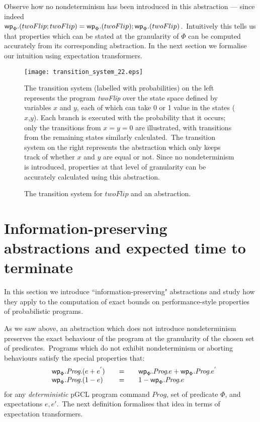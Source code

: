 \documentclass[numbers,copyright,creativecommons]{eptcs}
\newcommand{\Wp}{\mbox{\sf wp}}
\newcommand{\Prog}{\textit{Prog}}
\newcommand{\Wide}[1]{~~~#1~~~}
\begin{document}
Observe how no nondeterminism has been introduced in this abstraction --- since indeed \\$\mathord{\Wp_\Phi.(twoFlip;twoFlip) = \Wp_\Phi.(twoFlip);\Wp_\Phi.(twoFlip)}$.\ Intuitively this tells us that properties which can be stated at the granularity of $\Phi$ can be computed accurately from its corresponding abstraction. In the next section we formalise our intuition using  expectation transformers.
\begin{figure}
\begin{center}
\texttt{[image: transition\_system\_22.eps]}
\end{center}

\small{The transition system (labelled with probabilities) on the left represents the program \textit{twoFlip} over the state space defined by variables $x$ and $y$, each of which can take 0 or 1 value in the states ($x$,$y$). Each branch is executed with the probability that it occurs; only the transitions from $x=y=0$ are illustrated, with transitions from the remaining states similarly calculated.\ The transition system on the right represents the abstraction which only keeps track of whether $x$ and $y$ are equal or not. Since no nondeterminism is introduced, properties at that level of granularity can be accurately calculated using this abstraction.}
\caption{The transition system for $\textit{twoFlip}$ and an abstraction.}\label{f1716}
\end{figure}

\section{Information-preserving abstractions and expected time to terminate}\label{PDI}

In this section we introduce ``information-preserving" abstractions and study how they apply to the computation of exact bounds on performance-style properties of probabilistic programs.

As we saw above, an abstraction which does not introduce nondeterminism preserves the exact behaviour of the program at the granularity of the chosen set of predicates.\ Programs which do not exhibit nondeterminism or aborting behaviours satisfy the special properties that:
\[
\begin{array}{lll}
~~~  \Wp_\Phi.\Prog .(e + e^{'}) &\Wide{=}& \Wp_\Phi.\Prog.e  + \Wp_\Phi.\Prog.e^{'} \\

~~~  \Wp_\Phi.\Prog .(1 - e)  &\Wide{=}& 1 - \Wp_\Phi.\Prog .e \\

\end{array}
\]
for any {\it deterministic} pGCL program command $\Prog$, set of predicate $\Phi$, and  expectations $e, e'$.\ The next definition formalises that idea in terms of expectation transformers.
\end{document}
